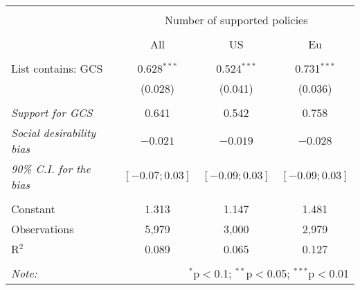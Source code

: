
\begin{tabular}{@{\extracolsep{5pt}}lccc} 
\\[-1.8ex]\hline 
\hline \\[-1.8ex] 
 & \multicolumn{3}{c}{Number of supported policies} \\ 
\cline{2-4} 
\\[-1.8ex] & All & US & Eu \\ 
\hline \\[-1.8ex] 
 List contains: GCS & 0.628$^{***}$ & 0.524$^{***}$ & 0.731$^{***}$ \\ 
  & (0.028) & (0.041) & (0.036) \\ 
\hline  \\[-1.8ex] \textit{Support for GCS} & 0.641  &  0.542  &  0.758 \\
\textit{Social desirability bias} & \textit{$ -0.021 $} & \textit{$ -0.019 $} & \textit{$ -0.028 $}\\
\textit{90\% C.I. for the bias} & \textit{ $[ -0.07 ; 0.03 ]$ } & \textit{ $[ -0.09 ; 0.03 ]$} & \textit{ $[ -0.09 ; 0.03 ]$}\\
 \hline \\[-1.8ex] 
Constant & 1.313 & 1.147 & 1.481 \\ 
Observations & 5,979 & 3,000 & 2,979 \\ 
R$^{2}$ & 0.089 & 0.065 & 0.127 \\ 
\hline 
\hline \\[-1.8ex] 
\textit{Note:}  & \multicolumn{3}{r}{$^{*}$p$<$0.1; $^{**}$p$<$0.05; $^{***}$p$<$0.01} \\ 
\end{tabular} 